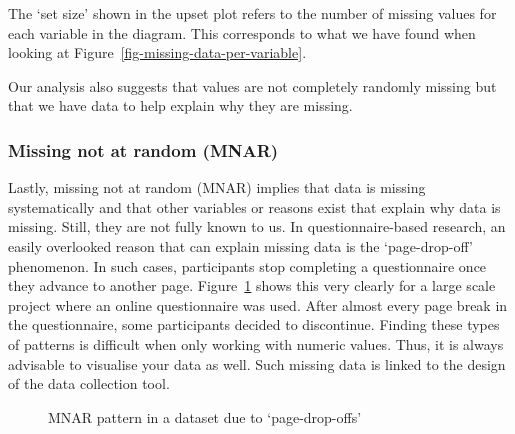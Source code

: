 \documentclass[
  letterpaper,
  DIV=11,
  numbers=noendperiod]{scrreprt}
\begin{document}
The `set size' shown in the upset plot refers to the number of missing
values for each variable in the diagram. This corresponds to what we
have found when looking at Figure~\ref{fig-missing-data-per-variable}.

Our analysis also suggests that values are not completely randomly
missing but that we have data to help explain why they are missing.

\subsubsection{Missing not at random
(MNAR)}\label{sec-missing-not-at-random-mnar}

Lastly, missing not at random (MNAR) implies that data is missing
systematically and that other variables or reasons exist that explain
why data is missing. Still, they are not fully known to us. In
questionnaire-based research, an easily overlooked reason that can
explain missing data is the `page-drop-off' phenomenon. In such cases,
participants stop completing a questionnaire once they advance to
another page. Figure~\ref{fig-mnar-example} shows this very clearly for
a large scale project where an online questionnaire was used. After
almost every page break in the questionnaire, some participants decided
to discontinue. Finding these types of patterns is difficult when only
working with numeric values. Thus, it is always advisable to visualise
your data as well. Such missing data is linked to the design of the data
collection tool.

\begin{figure}


\caption{\label{fig-mnar-example}MNAR pattern in a dataset due to
`page-drop-offs'}

\end{figure}%
\end{document}
